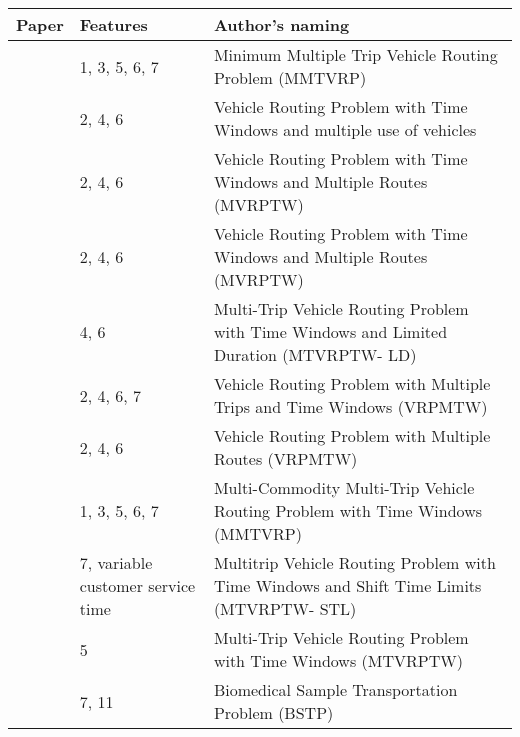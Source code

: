 \documentclass[11pt]{article}
\begin{document}
\begin{table}[]
\scriptsize
    \centering
    \begin{threeparttable}
    \begin{tabular}{@{}>{\raggedright}p{3cm}>{\raggedright}p{4cm}p{9cm}@{}}
    \toprule
         Paper  &   Features  &   Author's naming   \\
         \midrule
             \cite{battarra2009adaptive}
             & 1, 3, 5, 6, 7
             & Minimum Multiple Trip Vehicle Routing Problem (MMTVRP) \\
         \midrule
             \cite{azi2010exact}
             & 2, 4, 6
             & Vehicle Routing Problem with Time Windows and multiple use of vehicles \\
         \midrule
             \cite{macedo2011solving}
             & 2, 4, 6
             & Vehicle Routing Problem with Time Windows and Multiple Routes (MVRPTW) \\
         \midrule
             \cite{macedo2012generalized}
             & 2, 4, 6
             & Vehicle Routing Problem with Time Windows and Multiple Routes (MVRPTW) \\
         \midrule
             \cite{hernandez2014new}
             & 4, 6
             & Multi-Trip Vehicle Routing Problem with Time Windows and Limited Duration (MTVRPTW- LD) \\
         \midrule
             \cite{wang2014metaheuristic}
             & 2, 4, 6, 7
             & Vehicle Routing Problem with Multiple Trips and Time Windows (VRPMTW) \\
         \midrule
             \cite{azi2014adaptive}
             & 2, 4, 6
             & Vehicle Routing Problem with Multiple Routes (VRPMTW) \\
         \midrule
             \cite{cattaruzza2014iterated}
             & 1, 3, 5, 6, 7
             & Multi-Commodity Multi-Trip Vehicle Routing Problem with Time Windows (MMTVRP) \\
         \midrule
             \cite{karoonsoontawong2015efficient}
             & 7, variable customer service time
             & Multitrip Vehicle Routing Problem with Time Windows and Shift Time Limits (MTVRPTW- STL) \\
         \midrule
             \cite{hernandez2016branch}
             & 5
             & Multi-Trip Vehicle Routing Problem with Time Windows (MTVRPTW) \\
         \midrule
             \cite{anaya2016biomedical}
             & 7, 11
             & Biomedical Sample Transportation Problem (BSTP) \\

\end{tabular}
\end{threeparttable}
\end{table}
\end{document}
